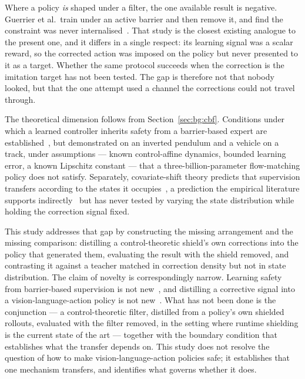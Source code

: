 \documentclass[a4paper,11pt]{report}
\begin{document}
Where a policy \emph{is} shaped under a filter, the one available result is negative. Guerrier et
al.\ train under an active barrier and then remove it, and find the constraint was never
internalised~\cite{guerrier2025guardrails}. That study is the closest existing analogue to the
present one, and it differs in a single respect: its learning signal was a scalar reward, so the
corrected action was imposed on the policy but never presented to it as a target. Whether the same
protocol succeeds when the correction is the imitation target has not been tested. The gap is
therefore not that nobody looked, but that the one attempt used a channel the corrections could not
travel through.

The theoretical dimension follows from Section~\ref{sec:bg:cbf}. Conditions under which a learned
controller inherits safety from a barrier-based expert are
established~\cite{cosner2022il_cbf}, but demonstrated on an inverted pendulum and a vehicle on a
track, under assumptions --- known control-affine dynamics, bounded learning error, a known
Lipschitz constant --- that a three-billion-parameter flow-matching policy does not satisfy.
Separately, covariate-shift theory predicts that supervision transfers according to the states it
occupies~\cite{ross2011dagger}, a prediction the empirical literature supports
indirectly~\cite{ciftci2025safegil,hoque2024intervengen} but has never tested by varying the state
distribution while holding the correction signal fixed.

This study addresses that gap by constructing the missing arrangement and the missing comparison:
distilling a control-theoretic shield's own corrections into the policy that generated them,
evaluating the result with the shield removed, and contrasting it against a teacher matched in
correction density but not in state distribution. The claim of novelty is correspondingly narrow.
Learning safety from barrier-based supervision is not new~\cite{cosner2022il_cbf}, and distilling a
corrective signal into a vision-language-action policy is not new~\cite{wang2026roadvla}. What has
not been done is the conjunction --- a control-theoretic filter, distilled from a policy's own
shielded rollouts, evaluated with the filter removed, in the setting where runtime shielding is the
current state of the art --- together with the boundary condition that establishes what the
transfer depends on. This study does not resolve the question of how to make
vision-language-action policies safe; it establishes that one mechanism transfers, and identifies
what governs whether it does.
\end{document}
